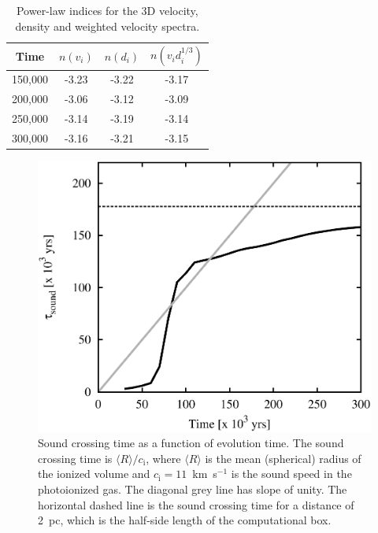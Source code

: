 \documentclass[useAMS,usenatbib]{mn2e}
\begin{document}
\begin{table}
\caption{Power-law indices for the 3D velocity, density and weighted
  velocity spectra.}
\label{tab:ps}
\begin{tabular}{cccc}
\hline
Time&$n(v_i)$ & $n(d_i)$ & $n(v_i d_i^{1/3})$\\
\hline
150,000 &  -3.23 & -3.22 &  -3.17 \\
200,000 &  -3.06 & -3.12 &  -3.09 \\
250,000 & -3.14 & -3.19 &  -3.14 \\
300,000 & -3.16 & -3.21 &  -3.15\\
\hline
\end{tabular}
\end{table}
\begin{figure}
\centering
\includegraphics[width=\linewidth]{scross}
\caption{Sound crossing time as a function of evolution time. The
  sound crossing time is $\langle R \rangle / c_\mathrm{i}$, where
  $\langle R \rangle$ is the mean (spherical) radius of the ionized
  volume and $c_\mathrm{i} = 11$~km~s$^{-1}$ is the sound speed in the
  photoionized gas. The diagonal grey line has slope of unity. The
  horizontal dashed line is the sound crossing time for a distance of
  2~pc, which is the half-side length of the computational box.}
\label{fig:scross}
\end{figure}
\end{document}
